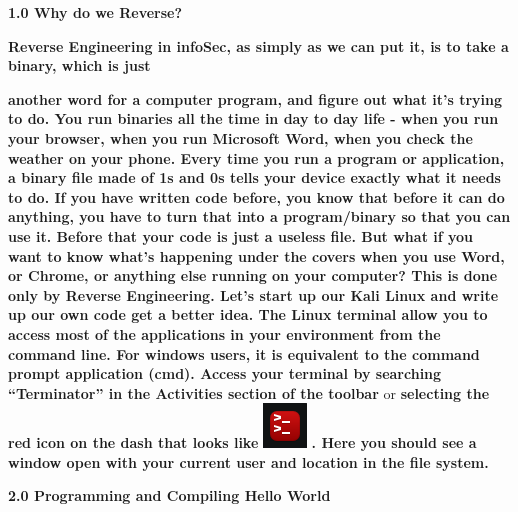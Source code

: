 \documentclass[letterpaper]{article}
\title{}
\author{}
\date{}
\newcommand{\sitfig}[3]{
\begin{figure}[H]
\centering
\makebox[\textwidth][c]{
#2
}
\caption{#3}
\label{#1}
\end{figure}
}
\newcommand{\sitgfx}[4][scale=1.0]{
\sitfig{#3}{\texttt{[image: \#2]}}{#4}
}
\begin{document}
\clearpage{}

\textbf{1.0 Why do we Reverse?}

\textbf{Reverse Engineering in infoSec, as simply as we can put it, is to take a
}\textbf{\textcolor[rgb]{0.21960784,0.4627451,0.11372549}{binary, }}\textbf{which is just }

\textbf{another word for a computer program, and figure out what it's trying to do. You run binaries all the time in day
to day life - when you run your browser, when you run Microsoft Word, when you check the weather on your phone. Every
time you run a program or application, a binary file made of 1s and 0s tells your device exactly what it needs to do.
\newline
\newline
If you have written code before, you know that before it can do anything, you have to turn that into a program/binary so
that you can use it. Before that your code is just a useless file. But what if you want to know what's happening under
the covers when you use Word, or Chrome, or anything else running on your computer? This is done only by Reverse
Engineering.  \newline
\newline
Let's start up our Kali Linux and write up our own code get a better idea. The Linux terminal allow you to access most
of the applications in your environment from the command line. For windows users, it is equivalent to the command
prompt application (cmd). Access your terminal by searching ``Terminator'' in the Activities section of the toolbar
}or\textbf{ selecting the red icon on the dash that looks like }
\includegraphics[width=0.4583in,height=0.4689in]{FINALWORKINGDOCFORMERLYPRECURSOR-img001.png}
 \textbf{. Here you should see a window open with your current user and location in the file system.\newline
}

{\centering
\textbf{2.0 Programming and Compiling Hello World}
\par}
\end{document}
